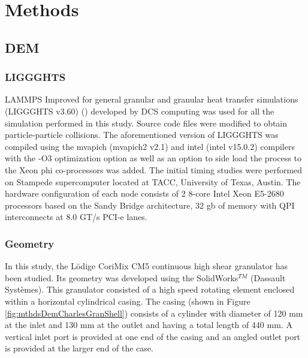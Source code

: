 \documentclass[preprint,11pt,authoryear]{elsarticle}
\begin{document}
\section{Methods}

\subsection{DEM}
\subsubsection{LIGGGHTS}
 LAMMPS Improved for general granular and granular heat transfer simulations (LIGGGHTS v3.60) 
(\cite{Kloss2012}) developed by DCS computing was used for all the simulation performed in this 
study. Source code files were modified to obtain particle-particle 
collisions. The aforementioned version of LIGGGHTS was compiled using the mvapich (mvapich2 v2.1) 
and intel (intel v15.0.2) compilers with the -O3 optimization option as well as an option to side load the 
process to the Xeon phi co-processors was added. The initial timing studies were performed on Stampede 
supercomputer located at TACC, University of Texas, Austin. The hardware configuration of each node 
consists of 2 8-core Intel Xeon E5-2680 processors based on the Sandy Bridge architecture, 32 gb of 
memory with QPI interconnects at 8.0 GT/s PCI-e lanes.


\subsubsection{Geometry}    

 In this study, the L\"{o}dige CoriMix CM5 continuous high shear granulator has been studied. Its 
geometry was developed using the SolidWorks$^{TM}$ (Dassault Syst\`{e}mes). This granulator 
consisted of a high speed rotating element enclosed within a horizontal cylindrical casing. The casing 
(shown in Figure \ref{fig:mthdsDemCharlesGranShell}) consists of a cylinder with diameter of 120 mm 
at the inlet and 130 mm at the outlet and having a total length of 440 mm. A vertical inlet port is 
provided at one end of the casing and an angled outlet port is provided at the larger end of the case. 
\end{document}
